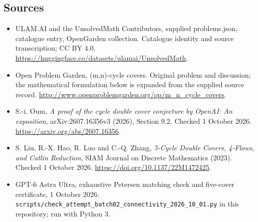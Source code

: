 \documentclass[11pt,a4paper]{article}
\begin{document}
\subsection{Sources}
\begin{itemize}
\item[S1] ULAM.AI and the UnsolvedMath Contributors, supplied problems.json, catalogue entry, OpenGarden collection. Catalogue identity and source transcription; CC BY 4.0.
\url{https://huggingface.co/datasets/ulamai/UnsolvedMath}.
\item[S2] Open Problem Garden, (m,n)-cycle covers. Original problem and discussion; the mathematical formulation below is expanded from the supplied source record.
\url{http://www.openproblemgarden.org/op/m_n_cycle_covers}.
\item[S3] S.-i. Oum, \emph{A proof of the cycle double cover conjecture by OpenAI: An exposition}, arXiv:2607.16356v3 (2026), Section 9.2. Checked 1 October 2026.
\url{https://arxiv.org/abs/2607.16356}.
\item[S4] S. Liu, R.-X. Hao, R. Luo and C.-Q. Zhang, \emph{5-Cycle Double Covers, 4-Flows, and Catlin Reduction}, SIAM Journal on Discrete Mathematics (2023). Checked 1 October 2026.
\url{https://doi.org/10.1137/22M1472425}.
\item[S5] GPT-6 Astra Ultra, exhaustive Petersen matching check and five-cover certificate, 1 October 2026: \texttt{scripts/check\_attempt\_batch02\_connectivity\_2026\_10\_01.py} in this repository; run with Python 3.
\end{itemize}
\end{document}
